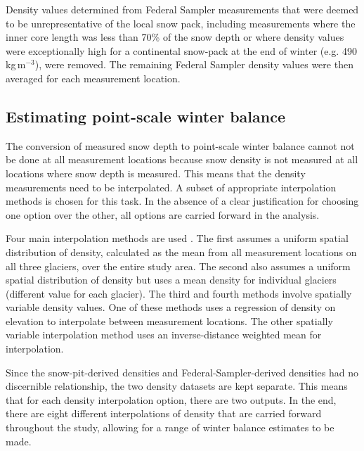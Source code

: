 \documentclass{sfuthesis}
\begin{document}
Density values determined from Federal Sampler measurements that were deemed to be unrepresentative of the local snow pack, including measurements where the inner core length was less than 70\% of the snow depth or where density values were exceptionally high for a continental snow-pack at the end of winter (e.g. 490\,kg\,m$^{-3}$), were removed. The remaining Federal Sampler density values were then averaged for each measurement location.

\subsection{Estimating point-scale winter balance}
\label{sec:swe_calc}

The conversion of measured snow depth to point-scale winter balance cannot not be done at all measurement locations because snow density is not measured at all locations where snow depth is measured. This means that the density measurements need to be interpolated. A subset of appropriate interpolation methods is chosen for this task. In the absence of a clear justification for choosing one option over the other, all options are carried forward in the analysis. 

Four main interpolation methods are used \citep{McGrath2015, Elder1991}. The first assumes a uniform spatial distribution of density, calculated as the mean from all measurement locations on all three glaciers, over the entire study area. The second  also assumes a uniform spatial distribution of density but uses a mean density for individual glaciers (different value for each glacier). The third and fourth methods involve spatially variable density values. One of these methods uses a regression of density on elevation to interpolate between measurement locations. The other spatially variable interpolation method uses an inverse-distance weighted mean for interpolation. 

Since the snow-pit-derived densities and Federal-Sampler-derived densities had no discernible relationship, the two density datasets are kept separate. This means that for each density interpolation option, there are two outputs. In the end, there are eight different interpolations of density that are carried forward throughout the study, allowing for a range of winter balance estimates to be made. 
\end{document}
